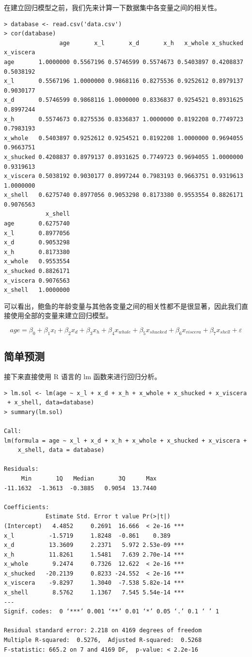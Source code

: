 在建立回归模型之前，我们先来计算一下数据集中各变量之间的相关性。

\begin{verbatim}
> database <- read.csv('data.csv')
> cor(database)
                age       x_l       x_d       x_h   x_whole x_shucked x_viscera
age       1.0000000 0.5567196 0.5746599 0.5574673 0.5403897 0.4208837 0.5038192
x_l       0.5567196 1.0000000 0.9868116 0.8275536 0.9252612 0.8979137 0.9030177
x_d       0.5746599 0.9868116 1.0000000 0.8336837 0.9254521 0.8931625 0.8997244
x_h       0.5574673 0.8275536 0.8336837 1.0000000 0.8192208 0.7749723 0.7983193
x_whole   0.5403897 0.9252612 0.9254521 0.8192208 1.0000000 0.9694055 0.9663751
x_shucked 0.4208837 0.8979137 0.8931625 0.7749723 0.9694055 1.0000000 0.9319613
x_viscera 0.5038192 0.9030177 0.8997244 0.7983193 0.9663751 0.9319613 1.0000000
x_shell   0.6275740 0.8977056 0.9053298 0.8173380 0.9553554 0.8826171 0.9076563
            x_shell
age       0.6275740
x_l       0.8977056
x_d       0.9053298
x_h       0.8173380
x_whole   0.9553554
x_shucked 0.8826171
x_viscera 0.9076563
x_shell   1.0000000
\end{verbatim}

可以看出，鲍鱼的年龄变量与其他各变量之间的相关性都不是很显著，因此我们直接使用全部的变量来建立回归模型。

\begin{equation}
  age = \beta_0 + \beta_1 x_l + \beta_2 x_d + \beta_3 x_h + \beta_4 x_{whole} + \beta_5 x_{shucked} + \beta_6 x_{viscera} + \beta_7 x_{shell} + \varepsilon
\end{equation}

\subsection{简单预测}

接下来直接使用 R 语言的 lm 函数来进行回归分析。

\begin{verbatim}
> lm.sol <- lm(age ~ x_l + x_d + x_h + x_whole + x_shucked + x_viscera
 + x_shell, data=database)
> summary(lm.sol)

Call:
lm(formula = age ~ x_l + x_d + x_h + x_whole + x_shucked + x_viscera + 
    x_shell, data = database)

Residuals:
     Min       1Q   Median       3Q      Max 
-11.1632  -1.3613  -0.3885   0.9054  13.7440 

Coefficients:
            Estimate Std. Error t value Pr(>|t|)    
(Intercept)   4.4852     0.2691  16.666  < 2e-16 ***
x_l          -1.5719     1.8248  -0.861    0.389    
x_d          13.3609     2.2371   5.972 2.53e-09 ***
x_h          11.8261     1.5481   7.639 2.70e-14 ***
x_whole       9.2474     0.7326  12.622  < 2e-16 ***
x_shucked   -20.2139     0.8233 -24.552  < 2e-16 ***
x_viscera    -9.8297     1.3040  -7.538 5.82e-14 ***
x_shell       8.5762     1.1367   7.545 5.54e-14 ***
---
Signif. codes:  0 ‘***’ 0.001 ‘**’ 0.01 ‘*’ 0.05 ‘.’ 0.1 ‘ ’ 1

Residual standard error: 2.218 on 4169 degrees of freedom
Multiple R-squared:  0.5276,  Adjusted R-squared:  0.5268 
F-statistic: 665.2 on 7 and 4169 DF,  p-value: < 2.2e-16
\end{verbatim}

